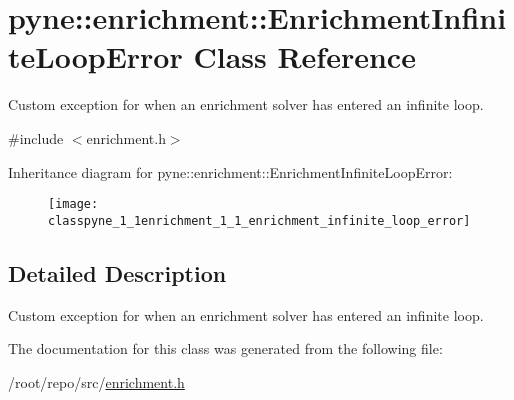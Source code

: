 \hypertarget{classpyne_1_1enrichment_1_1_enrichment_infinite_loop_error}{}\section{pyne\+:\+:enrichment\+:\+:Enrichment\+Infinite\+Loop\+Error Class Reference}
\label{classpyne_1_1enrichment_1_1_enrichment_infinite_loop_error}


Custom exception for when an enrichment solver has entered an infinite loop.  




{\ttfamily \#include $<$enrichment.\+h$>$}

Inheritance diagram for pyne\+:\+:enrichment\+:\+:Enrichment\+Infinite\+Loop\+Error\+:\begin{figure}[H]
\begin{center}
\leavevmode
\texttt{[image: classpyne\_1\_1enrichment\_1\_1\_enrichment\_infinite\_loop\_error]}
\end{center}
\end{figure}


\subsection{Detailed Description}
Custom exception for when an enrichment solver has entered an infinite loop. 

The documentation for this class was generated from the following file\+:\begin{DoxyCompactItemize}
\item 
/root/repo/src/\hyperlink{enrichment_8h}{enrichment.\+h}\end{DoxyCompactItemize}
